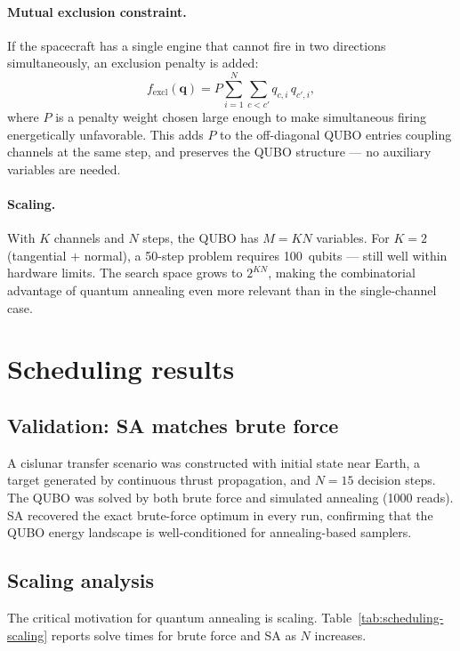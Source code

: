 \documentclass[8pt,a4paper]{article}
\newcommand{\bvec}[1]{\bm{#1}}
\theoremstyle{definition}
\theoremstyle{remark}
\begin{document}
\paragraph{Mutual exclusion constraint.}
If the spacecraft has a single engine that cannot fire in two
directions simultaneously, an exclusion penalty is added:
\[
  f_{\mathrm{excl}}(\bvec q) = P \sum_{i=1}^{N} \sum_{c < c'}
  q_{c,i}\, q_{c',i},
\]
where $P$ is a penalty weight chosen large enough to make
simultaneous firing energetically unfavorable.  This adds $P$ to the
off-diagonal QUBO entries coupling channels at the same step, and
preserves the QUBO structure — no auxiliary variables are needed.

\paragraph{Scaling.}
With $K$ channels and $N$ steps, the QUBO has $M = KN$ variables.
For $K = 2$ (tangential $+$ normal), a 50-step problem requires
100~qubits — still well within hardware limits.  The search space
grows to $2^{KN}$, making the combinatorial advantage of quantum
annealing even more relevant than in the single-channel case.


\section{Scheduling results}\label{sec:scheduling-results}

\subsection{Validation: SA matches brute force}

A cislunar transfer scenario was constructed with initial state
near Earth, a target generated by continuous thrust propagation, and
$N = 15$ decision steps.  The QUBO was solved by both brute force and
simulated annealing (1000 reads).  SA recovered the exact brute-force
optimum in every run, confirming that the QUBO energy landscape is
well-conditioned for annealing-based samplers.

\subsection{Scaling analysis}

The critical motivation for quantum annealing is scaling.
Table~\ref{tab:scheduling-scaling} reports solve times for brute force
and SA as $N$ increases.
\end{document}
